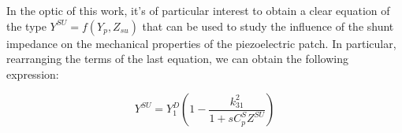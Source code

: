 In the optic of this work, it's of particular interest to obtain a clear equation of the type $Y^{SU} = f(Y_p, Z_{su})$ that can be used to study the influence of the shunt impedance on the mechanical properties of the piezoelectric patch.
In particular, rearranging the terms of the last equation, we can obtain the following expression:

\begin{equation}
    Y^{SU} = Y_1^D \left( 1 - \frac{k_{31}^2}{1 + s C_p^S Z^{SU}} \right)
    \label{eq:mechanical_admittance_shunted_piezoelectric_patch}
\end{equation}

